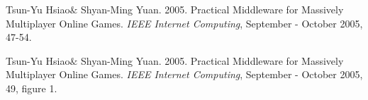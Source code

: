 \begin{thebibliography}{9}

	Tsun-Yu Hsiao$\&$ Shyan-Ming Yuan.
	2005.	
 	Practical Middleware for Massively Multiplayer Online Games.
	\emph{IEEE Internet Computing},
	September - October 2005, 47-54.

	Tsun-Yu Hsiao$\&$ Shyan-Ming Yuan.
	2005.	
 	Practical Middleware for Massively Multiplayer Online Games.
	\emph{IEEE Internet Computing},
	September - October 2005, 49, figure 1.
\end{thebibliography}